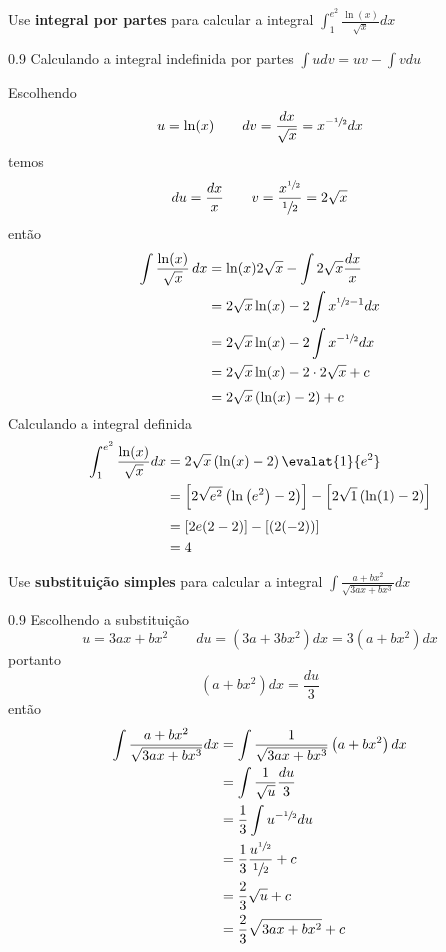 \documentclass[a4paper,12pt,fleqn]{article}
\newenvironment{resposta}%
  {\begingroup\color{blue}\small\begin{spacing}{0.9}}%
  {\end{spacing}\endgroup}
\begin{document}

\vspace{\baselineskip}
Use \textbf{integral por partes} para calcular a integral
\(
  \int_1^{e^2} \frac{\ln(x)}{\sqrt{x}} dx
\)
\begin{resposta}
  Calculando a integral indefinida por partes \(\int udv = uv - \int vdu\)

  Escolhendo
  \[
    u=\ln(x) \qquad dv = \frac{dx}{\sqrt{x}} = x^{-\sfrac{1}{2}} dx
  \]
  temos
  \[
    du = \frac{dx}{x}
    \qquad
    v = \frac{x^{\sfrac{1}{2}}}{\sfrac{1}{2}} = 2\sqrt{x}
  \]
  então
  \begin{align*}
    \int \frac{\ln(x)}{\sqrt{x}} \, dx
    & = \ln(x)2\sqrt{x} - \int 2\sqrt{x} \frac{dx}{x} \\
    & = 2\sqrt{x}\ln(x) - 2\int x^{\sfrac{1}{2}-1} dx \\
    & = 2\sqrt{x}\ln(x) - 2\int x^{-\sfrac{1}{2}} dx \\
    & = 2\sqrt{x}\ln(x) - 2\cdot 2\sqrt{x} + c \\[1mm]
    & = 2\sqrt{x} \left(\ln(x) - 2 \right) + c
  \end{align*}
  Calculando a integral definida
  \begin{align*}
  \int_1^{e^2} \frac{\ln(x)}{\sqrt{x}} dx
  & = 2\sqrt{x} \left(\ln(x) - 2 \right) \evalat{1}{e^2} \\
  & = \left[2\sqrt{e^2} \left(\ln\left(e^2\right) - 2 \right)\right]
    - \left[2\sqrt{1}   \left(\ln(1)              - 2 \right)\right] \\[1mm]
  & = \left[2e(2-2)\right] - \left[(2(-2))\right] \\
  & = 4
  \end{align*}

\end{resposta}

Use \textbf{substituição simples} para calcular a integral
\(
  \int \frac{a+bx^2}{\sqrt{3ax+bx^3}} dx
\)

\begin{resposta}
  Escolhendo a substituição
  \[
    u = 3ax+bx^2
    \qquad
    du = \left(3a + 3bx^2\right) dx = 3\left(a + bx^2\right) dx
  \]
  portanto
  \[
    \left(a+bx^2\right)dx = \frac{du}{3}
  \]
  então
  \begin{align*}
    \int \frac{a+bx^2}{\sqrt{3ax+bx^3}} dx
    & = \int \frac{1}{\sqrt{3ax+bx^3}} \left(a+bx^2\right)dx \\
    & = \int \frac{1}{\sqrt{u}} \frac{du}{3} \\
    & = \frac{1}{3} \int u^{-\sfrac{1}{2}} du \\
    & = \frac{1}{3} \frac{u^{\sfrac{1}{2}}}{\sfrac{1}{2}} + c \\
    & = \frac{2}{3} \sqrt{u} + c \\
    & = \frac{2}{3} \sqrt{3ax+bx^2} + c
  \end{align*}
\end{resposta}
\end{document}
